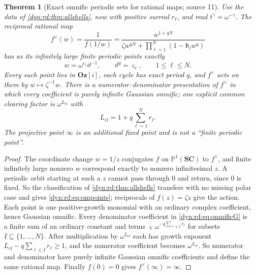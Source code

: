\documentclass[11pt,letterpaper]{article}
\newtheorem{theorem}{Theorem}[section]
\theoremstyle{definition}
\theoremstyle{remark}
\newcommand{\SC}{\mathbf{SC}}
\newcommand{\Oz}{\mathbf{Oz}}
\numberwithin{equation}{section}
\begin{document}
\begin{theorem}[Exact omnific periodic sets for rational maps; source 11]
\label{dyn:rd:thm:omnific}
Use the data of \cref{dyn:rd:thm:allshells}, now with positive surreal
$r_\ell$, and read $t^{\gamma}=\omega^{-\gamma}$. The reciprocal rational map
\begin{equation}\label{dyn:rd:eq:omnificG}
 f^{\vee}(w)=\frac1{f(1/w)}
 =\frac{w^{1+qN}}{\zeta w^{qN}+\prod_{\ell=1}^{N}(1-\mathfrak b_\ell w^{q})}
\end{equation}
has as its infinitely large finite periodic points exactly
\begin{equation}\label{dyn:rd:eq:ompoints}
 w=\omega^{r_\ell}\vartheta^{-1},\qquad \vartheta^{q}=\varsigma_\ell,\qquad
 1\le\ell\le N .
\end{equation}
Every such point lies in $\Oz[i]$, each cycle has exact period $q$, and
$f^{\vee}$ acts on them by $w\mapsto\zeta^{-1}w$. There is a
numerator--denominator presentation of $f^{\vee}$ in which every coefficient
is purely infinite Gaussian omnific; one explicit common clearing factor is
$\omega^{L_{\mathrm{cl}}}$ with
\begin{equation}\label{dyn:rd:eq:clearL}
 L_{\mathrm{cl}}=1+q\sum_{\ell=1}^{N}r_\ell .
\end{equation}
The projective point $\infty$ is an additional fixed point and is not a
``finite periodic point''.
\end{theorem}
\begin{proof}
The coordinate change $w=1/z$ conjugates $f$ on $\mathbb P^{1}(\SC)$ to
$f^{\vee}$, and finite infinitely large nonzero $w$ correspond exactly to
nonzero infinitesimal $z$. A periodic orbit starting at such a $z$ cannot
pass through $0$ and return, since $0$ is fixed. So the classification of
\cref{dyn:rd:thm:allshells} transfers with no missing polar case and gives
\eqref{dyn:rd:eq:ompoints}; reciprocals of $f(z)=\zeta z$ give the action.
Each point is one positive-growth monomial with an ordinary complex
coefficient, hence Gaussian omnific. Every denominator coefficient in
\eqref{dyn:rd:eq:omnificG} is a finite sum of an ordinary constant and terms
$\varsigma\,\omega^{-q\sum_{\ell\in I}r_\ell}$ for subsets
$I\subseteq\{1,\dots,N\}$. After multiplication by
$\omega^{L_{\mathrm{cl}}}$ each has growth exponent
$L_{\mathrm{cl}}-q\sum_{\ell\in I}r_\ell\ge1$, and the numerator coefficient
becomes $\omega^{L_{\mathrm{cl}}}$. So numerator and denominator have purely
infinite Gaussian omnific coefficients and define the same rational map.
Finally $f(0)=0$ gives $f^{\vee}(\infty)=\infty$.
\end{proof}
\end{document}
